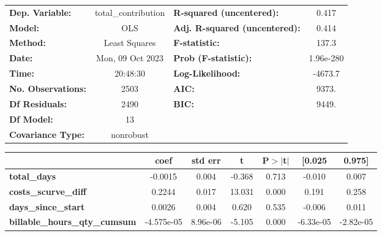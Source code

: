 \begin{center}
\begin{tabular}{lclc}
\toprule
\textbf{Dep. Variable:}                     & total\_contribution & \textbf{  R-squared (uncentered):}      &     0.417   \\
\textbf{Model:}                             &         OLS         & \textbf{  Adj. R-squared (uncentered):} &     0.414   \\
\textbf{Method:}                            &    Least Squares    & \textbf{  F-statistic:       }          &     137.3   \\
\textbf{Date:}                              &   Mon, 09 Oct 2023  & \textbf{  Prob (F-statistic):}          & 1.96e-280   \\
\textbf{Time:}                              &       20:48:30      & \textbf{  Log-Likelihood:    }          &   -4673.7   \\
\textbf{No. Observations:}                  &          2503       & \textbf{  AIC:               }          &     9373.   \\
\textbf{Df Residuals:}                      &          2490       & \textbf{  BIC:               }          &     9449.   \\
\textbf{Df Model:}                          &            13       & \textbf{                     }          &             \\
\textbf{Covariance Type:}                   &      nonrobust      & \textbf{                     }          &             \\
\bottomrule
\end{tabular}
\begin{tabular}{lcccccc}
                                            & \textbf{coef} & \textbf{std err} & \textbf{t} & \textbf{P$> |$t$|$} & \textbf{[0.025} & \textbf{0.975]}  \\
\midrule
\textbf{total\_days}                        &      -0.0015  &        0.004     &    -0.368  &         0.713        &       -0.010    &        0.007     \\
\textbf{costs\_scurve\_diff}                &       0.2244  &        0.017     &    13.031  &         0.000        &        0.191    &        0.258     \\
\textbf{days\_since\_start}                 &       0.0026  &        0.004     &     0.620  &         0.535        &       -0.006    &        0.011     \\
\textbf{billable\_hours\_qty\_cumsum}       &   -4.575e-05  &     8.96e-06     &    -5.105  &         0.000        &    -6.33e-05    &    -2.82e-05     \\

\end{tabular}
\end{center}
